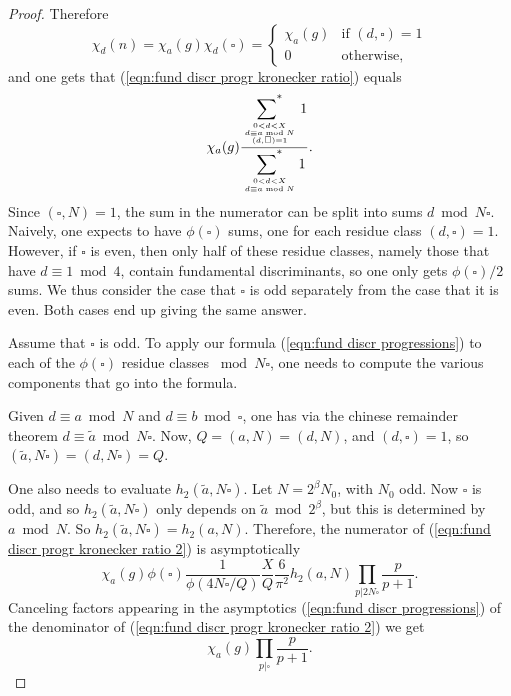 \documentclass[12pt,letterpaper]{amsart}
\theoremstyle{plain}
\theoremstyle{definition}
\theoremstyle{remark}
\numberwithin{equation}{subsection}
\numberwithin{theorem}{subsection}
\numberwithin{table}{subsection}
\newcommand{\ontop}[2]{\genfrac{}{}{0pt}{}{#1}{#2}}
\def\sumstar{\operatornamewithlimits{\sum\nolimits^*}}
\begin{document}
\begin{proof}
Therefore
\begin{equation}
     \chi_d(n) = \chi_a(g) \chi_d(\square) =
     \begin{cases}
         \chi_a(g) &\text{if $(d,\square)=1$} \\
         0 &\text{otherwise,}
     \end{cases}
\end{equation}
and one gets that (\ref{eqn:fund discr progr kronecker ratio}) equals
\begin{equation}
\label{eqn:fund discr progr kronecker ratio 2}
    \chi_a(g)
    \frac{\displaystyle
        \sumstar_{\ontop{\ontop{0 < d < X}{d \equiv a \bmod N}}{(d,\square)=1}} 1
    }
    {\displaystyle
        \sumstar_{\ontop{0 < d < X}{d \equiv a \bmod N}} 1
    }.
\end{equation}
Since $(\square,N)=1$, the sum in the numerator can be split into sums $d \bmod N \square$.
Naively, one expects to have $\phi(\square)$ sums, one for each residue class $(d,\square)=1$.
However, if $\square$ is even, then only half of these residue classes, namely 
those that have $d \equiv 1 \bmod 4$, contain fundamental discriminants, so one only gets
$\phi(\square)/2$ sums. We thus consider the case that $\square$ is odd separately from
the case that it is even. Both cases end up giving the same answer.

Assume that $\square$ is odd. To apply our formula (\ref{eqn:fund discr progressions})
to each of the $\phi(\square)$ residue classes $\bmod N \square$, one needs to compute
the various components that go into the formula.

Given $d \equiv a \bmod N$ 
and $d \equiv b \bmod \square$, one has via the chinese remainder 
theorem $d \equiv \tilde{a} \bmod N \square$. Now, $Q=(a,N)=(d,N)$, and $(d,\square) = 1$,
so $(\tilde{a},N\square)=(d,N\square)=Q$.

One also needs to evaluate $h_2(\tilde{a}, N \square)$. Let $N=2^\beta N_0$, with
$N_0$ odd. Now $\square$ is odd, and so $h_2(\tilde{a},N\square)$ only depends on
$\tilde{a} \bmod 2^\beta$, but this is determined by $a \bmod N$. So 
$h_2(\tilde{a},N\square)=h_2(a,N)$.
Therefore, the numerator of (\ref{eqn:fund discr progr kronecker ratio 2}) is 
asymptotically
\begin{equation}
    \chi_a(g)  \phi(\square)
    \frac{1}{\phi(4N\square/Q)} \frac{X}{Q} \frac{6}{\pi^2}
    h_2(a,N)
    \prod_{p|2N\square} \frac{p}{p+1}.
\end{equation}
Canceling factors appearing in the asymptotics (\ref{eqn:fund discr progressions})
of the denominator of
(\ref{eqn:fund discr progr kronecker ratio 2}) we get
\begin{equation}
    \chi_a(g)  \prod_{p| \square} \frac{p}{p+1}.
\end{equation}


\end{proof}
\end{document}
